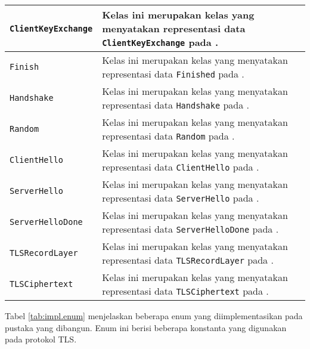 \begin{longtable}{|p{3.5cm}|p{9cm}|}
    \texttt{ClientKeyExchange} & Kelas ini merupakan kelas yang menyatakan representasi data \texttt{ClientKeyExchange} pada \textcite{rfc5246}.\\ \hline
    \texttt{Finish} & Kelas ini merupakan kelas yang menyatakan representasi data \texttt{Finished} pada \textcite{rfc5246}.\\ \hline
    \texttt{Handshake} & Kelas ini merupakan kelas yang menyatakan representasi data \texttt{Handshake} pada \textcite{rfc5246}.\\ \hline
    \texttt{Random} & Kelas ini merupakan kelas yang menyatakan representasi data \texttt{Random} pada \textcite{rfc5246}.\\ \hline
    \texttt{ClientHello} & Kelas ini merupakan kelas yang menyatakan representasi data \texttt{ClientHello} pada \textcite{rfc5246}.\\ \hline
    \texttt{ServerHello} & Kelas ini merupakan kelas yang menyatakan representasi data \texttt{ServerHello} pada \textcite{rfc5246}.\\ \hline
    \texttt{ServerHelloDone} & Kelas ini merupakan kelas yang menyatakan representasi data \texttt{ServerHelloDone} pada \textcite{rfc5246}.\\ \hline
    \texttt{TLSRecordLayer} & Kelas ini merupakan kelas yang menyatakan representasi data \texttt{TLSRecordLayer} pada \textcite{rfc5246}.\\ \hline
    \texttt{TLSCiphertext} & Kelas ini merupakan kelas yang menyatakan representasi data \texttt{TLSCiphertext} pada \textcite{rfc5246}.\\ \hline
\end{longtable}

Tabel \ref{tab:impl.enum} menjelaskan beberapa enum yang diimplementasikan pada pustaka yang dibangun. Enum ini berisi beberapa konstanta yang digunakan pada protokol TLS.

